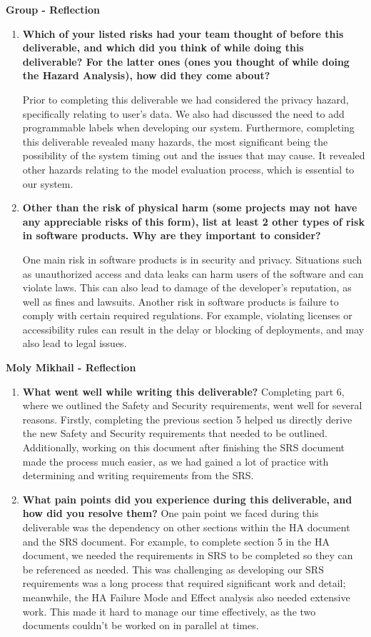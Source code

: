 \documentclass{article}
\begin{document}
\textbf{Group - Reflection}
\begin{enumerate}
     \item \textbf{Which of your listed risks had your team thought of before this
    deliverable, and which did you think of while doing this deliverable? For
    the latter ones (ones you thought of while doing the Hazard Analysis), how
    did they come about?}

    Prior to completing this deliverable we had considered the privacy hazard, specifically relating to user's data. 
    We also had discussed the need to add programmable labels when developing our system. Furthermore, completing this deliverable
    revealed many hazards, the most significant being the possibility of the system timing out and the issues that may cause. 
    It revealed other hazards relating to the model evaluation process, which is essential to our system. 


    \item \textbf{Other than the risk of physical harm (some projects may not have any
    appreciable risks of this form), list at least 2 other types of risk in
    software products. Why are they important to consider?}

    One main risk in software products is in security and privacy. Situations such as unauthorized access and data leaks can harm users of the software and 
    can violate laws. This can also lead to damage of the developer's reputation, as well as fines and lawsuits. Another risk in software products is failure to comply with 
    certain required regulations. For example, violating licenses or accessibility rules can result in the delay or blocking of deployments, and may also lead 
    to legal issues. 
\end{enumerate}

\textbf{Moly Mikhail - Reflection}
\begin{enumerate}
    \item \textbf{What went well while writing this deliverable?}
    Completing part 6, where we outlined the Safety and Security requirements, 
    went well for several reasons. Firstly, completing the previous section 5 helped us directly derive the new Safety and
    Security requirements that needed to be outlined. Additionally, working on this document after finishing the SRS
    document made the process much easier, as we had gained a lot of practice with determining and writing requirements from the SRS. 
    \item \textbf{What pain points did you experience during this deliverable, and how
    did you resolve them?}
    One pain point we faced during this deliverable was the dependency on other sections within the 
    HA document and the SRS document. For example, to complete section 5 in the HA document, we needed
    the requirements in SRS to be completed so they can be referenced as needed. This was challenging as 
    developing our SRS requirements was a long process that required significant work and detail; 
    meanwhile, the HA Failure Mode and Effect analysis also needed extensive work.  
    This made it hard to manage our time effectively, as the two documents couldn’t be worked on in parallel at times. 
\end{enumerate}
\end{document}

